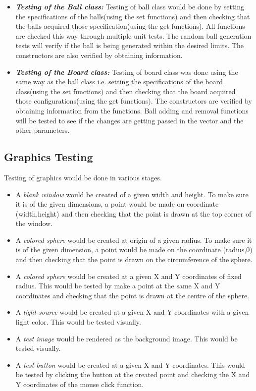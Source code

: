 \documentclass{article}
\begin{document}
\begin{itemize}
\item \textbf{\textit{Testing of the Ball class:}}
Testing of ball class would be done by setting the specifications of the balls(using the set functions) and then checking that the balls acquired those specification(using the get functions). All functions are checked this way through multiple unit tests. The random ball generation tests will verify if the ball is being generated within the desired limits. The constructors are also verified by obtaining information.

\item \textbf{\textit{Testing of the Board class:}}
Testing of board class was done using the same way as the ball class i.e. setting the specifications of the board class(using the set functions) and then checking that the board acquired those configurations(using the get functions). The constructors are verified by obtaining information from the functions. Ball adding and removal functions will be tested to see if the changes are getting passed in the vector and the other parameters.
\end{itemize}

\subsection{Graphics Testing}
Testing of graphics would be done in various stages. 
\begin{itemize}
\item A \textit{blank window} would be created of a given width and height. To make sure it is of the given dimensions, a point would be made on coordinate (width,height) and then checking that the point is drawn at the top corner of the window. 
\item A \textit{colored sphere} would be created at origin of a given radius. To make sure it is of the given dimension, a point would be made on the coordinate (radius,0) and then checking that the point is drawn on the circumference of the sphere.
\item A \textit{colored sphere} would be created at a given X and Y coordinates of fixed radius. This would be tested by make a point at the same X and Y coordinates and checking that the point is drawn at the centre of the sphere.
\item A \textit{light source} would be created at a given X and Y coordinates with a given light color. This would be tested visually.
\item A \textit{test image} would be rendered as the background image. This would be tested visually.
\item A \textit{test button} would be created at a given X and Y coordinates. This would be tested by clicking the button at the created point and checking the X and Y coordinates of the mouse click function.
\end{itemize}
\end{document}
